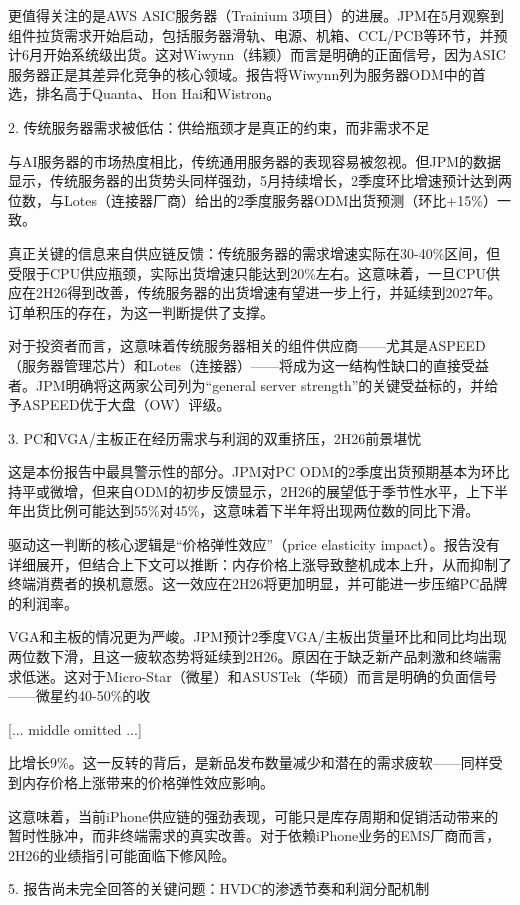 \documentclass[11pt]{ctexart}
\begin{document}
更值得关注的是AWS ASIC服务器（Trainium 3项目）的进展。JPM在5月观察到组件拉货需求开始启动，包括服务器滑轨、电源、机箱、CCL/PCB等环节，并预计6月开始系统级出货。这对Wiwynn（纬颖）而言是明确的正面信号，因为ASIC服务器正是其差异化竞争的核心领域。报告将Wiwynn列为服务器ODM中的首选，排名高于Quanta、Hon Hai和Wistron。

2. 传统服务器需求被低估：供给瓶颈才是真正的约束，而非需求不足

与AI服务器的市场热度相比，传统通用服务器的表现容易被忽视。但JPM的数据显示，传统服务器的出货势头同样强劲，5月持续增长，2季度环比增速预计达到两位数，与Lotes（连接器厂商）给出的2季度服务器ODM出货预测（环比+15\%）一致。

真正关键的信息来自供应链反馈：传统服务器的需求增速实际在30-40\%区间，但受限于CPU供应瓶颈，实际出货增速只能达到20\%左右。这意味着，一旦CPU供应在2H26得到改善，传统服务器的出货增速有望进一步上行，并延续到2027年。订单积压的存在，为这一判断提供了支撑。

对于投资者而言，这意味着传统服务器相关的组件供应商——尤其是ASPEED（服务器管理芯片）和Lotes（连接器）——将成为这一结构性缺口的直接受益者。JPM明确将这两家公司列为“general server strength”的关键受益标的，并给予ASPEED优于大盘（OW）评级。

3. PC和VGA/主板正在经历需求与利润的双重挤压，2H26前景堪忧

这是本份报告中最具警示性的部分。JPM对PC ODM的2季度出货预期基本为环比持平或微增，但来自ODM的初步反馈显示，2H26的展望低于季节性水平，上下半年出货比例可能达到55\%对45\%，这意味着下半年将出现两位数的同比下滑。

驱动这一判断的核心逻辑是“价格弹性效应”（price elasticity impact）。报告没有详细展开，但结合上下文可以推断：内存价格上涨导致整机成本上升，从而抑制了终端消费者的换机意愿。这一效应在2H26将更加明显，并可能进一步压缩PC品牌的利润率。

VGA和主板的情况更为严峻。JPM预计2季度VGA/主板出货量环比和同比均出现两位数下滑，且这一疲软态势将延续到2H26。原因在于缺乏新产品刺激和终端需求低迷。这对于Micro-Star（微星）和ASUSTek（华硕）而言是明确的负面信号——微星约40-50\%的收

[... middle omitted ...]

比增长9\%。这一反转的背后，是新品发布数量减少和潜在的需求疲软——同样受到内存价格上涨带来的价格弹性效应影响。

这意味着，当前iPhone供应链的强劲表现，可能只是库存周期和促销活动带来的暂时性脉冲，而非终端需求的真实改善。对于依赖iPhone业务的EMS厂商而言，2H26的业绩指引可能面临下修风险。

5. 报告尚未完全回答的关键问题：HVDC的渗透节奏和利润分配机制
\end{document}
